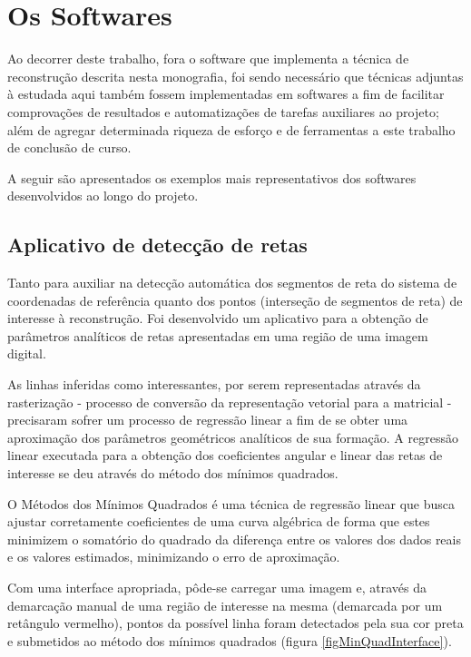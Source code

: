 \chapter{Os Softwares}
	\label{capituloSoftwares}

	Ao decorrer deste trabalho, fora o software que implementa a técnica de reconstrução descrita nesta monografia, foi sendo necessário que técnicas adjuntas à estudada aqui também fossem implementadas em softwares a fim de facilitar comprovações de resultados e automatizações de tarefas auxiliares ao projeto; além de agregar determinada riqueza de esforço e de ferramentas a este trabalho de conclusão de curso.
	
	A seguir são apresentados os exemplos mais representativos dos softwares desenvolvidos ao longo do projeto.
	
	\section{Aplicativo de detecção de retas}
		\label{appDeteccaoRetas}
		Tanto para auxiliar na detecção automática dos segmentos de reta do sistema de coordenadas de referência quanto dos pontos (interseção de segmentos de reta) de interesse à reconstrução. Foi desenvolvido um aplicativo para a obtenção de parâmetros analíticos de retas apresentadas em uma região de uma imagem digital.
		
		As linhas inferidas como interessantes, por serem representadas através da rasterização - processo de conversão da representação vetorial para a matricial \cite{compGrafTeoPrat} - precisaram sofrer um processo de regressão linear a fim de se obter uma aproximação dos parâmetros geométricos analíticos de sua formação. A regressão linear executada para a obtenção dos coeficientes angular e linear das retas de interesse se deu através do método dos mínimos quadrados.
	
	O Métodos dos Mínimos Quadrados é uma técnica de regressão linear que busca ajustar corretamente coeficientes de uma curva algébrica de forma que estes minimizem o somatório do quadrado da diferença entre os valores dos dados reais e os valores estimados, minimizando o erro de aproximação.
	
	Com uma interface apropriada, pôde-se carregar uma imagem e, através da demarcação manual de uma região de interesse na mesma (demarcada por um retângulo vermelho), pontos da possível linha foram detectados pela sua cor preta e submetidos ao método dos mínimos quadrados (figura \ref{figMinQuadInterface}).
	

